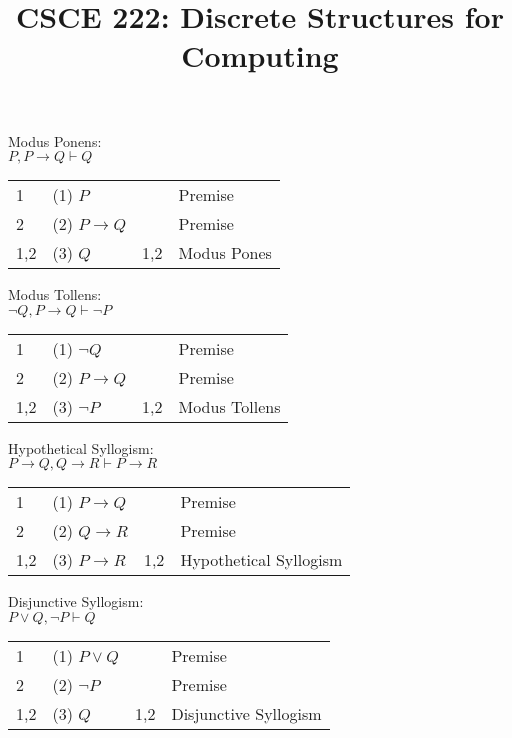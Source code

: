 \documentclass{article}
\title{CSCE 222: Discrete Structures for Computing\\\mysemester}
\author{\myname}
\date{}
\theoremstyle{definition}
\begin{document}
\maketitle

\bigskip

\noindent
Modus Ponens:\\

$P,P \to Q \vdash Q$\\

\begin{tabular}{llll}
1 & (1) $P$ &  & Premise\\
2 & (2) $P \to Q$ &  & Premise\\
1,2 & (3) $Q$ & 1,2 & Modus Pones\\
\end{tabular}

\bigskip
\bigskip

\noindent
Modus Tollens: \\

$ \neg Q,P \to Q \vdash  \neg P$\\

\begin{tabular}{llll}
1 & (1) $ \neg Q$ &  & Premise\\
2 & (2) $P \to Q$ &  & Premise\\
1,2 & (3) $ \neg P$ & 1,2 & Modus Tollens\\
\end{tabular}

\bigskip
\bigskip

\noindent
Hypothetical Syllogism: \\

$P \to Q,Q \to R \vdash P \to R$\\

\begin{tabular}{llll}
1 & (1) $P \to Q$ &  & Premise\\
2 & (2) $Q \to R$ &  & Premise\\
1,2 & (3) $P \to R$ & 1,2 & Hypothetical Syllogism\\
\end{tabular}

\bigskip
\bigskip

\noindent
Disjunctive Syllogism: \\

$P \vee Q, \neg P \vdash Q$\\

\begin{tabular}{llll}
1 & (1) $P \vee Q$ &  & Premise\\
2 & (2) $ \neg P$ &  & Premise\\
1,2 & (3) $Q$ & 1,2 & Disjunctive Syllogism\\
\end{tabular}
\end{document}
